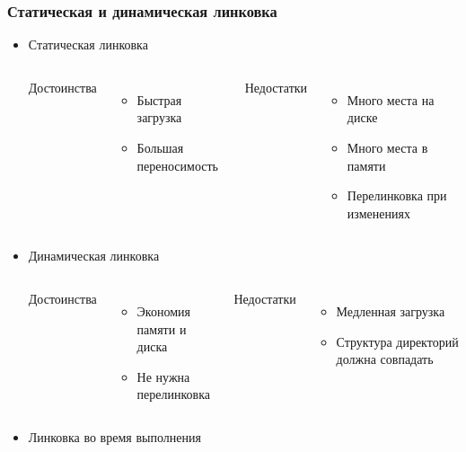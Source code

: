 \begin{frame}
 \frametitle{Статическая и динамическая линковка}
 \begin{itemize}
   \item Статическая линковка
     \begin{columns}
       \begin{center}
         Достоинства 
       \end{center}
       \begin{itemize}
         \item Быстрая загрузка
         \item Большая переносимость
       \end{itemize}
       \begin{center}
         Недостатки
       \end{center}
       \begin{itemize}
         \item Много места на диске
         \item Много места в памяти
         \item Перелинковка при изменениях
       \end{itemize}
     \end{columns}
   \item Динамическая линковка
     \begin{columns}
       \begin{center}
         Достоинства 
       \end{center}
       \begin{itemize}
         \item Экономия памяти и диска
         \item Не нужна перелинковка
       \end{itemize}
       \begin{center}
         Недостатки
       \end{center}
       \begin{itemize}
         \item Медленная загрузка
         \item Структура директорий должна совпадать
       \end{itemize}
        
     \end{columns}
    \item{Линковка во время выполнения}
 \end{itemize}
\end{frame}

